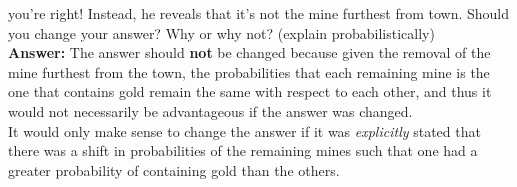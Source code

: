 \documentclass[12pt, letterpaper, twoside]{article}
\begin{document}
\begin{enumerate}
\begin{enumerate}
			you’re right! Instead, he reveals that it’s not the
			mine furthest from town. Should you change your answer?
			Why or why not? (explain probabilistically)\\
			\textbf{Answer:} The answer should \textbf{not} be changed because
			given the removal of the mine furthest from the town,
			the probabilities that each remaining mine is the one that
			contains gold remain the same with respect to each other,
			and thus it would not necessarily be advantageous if
			the answer was changed.\\
			It would only make sense to change
			the answer if it was \textit{explicitly} stated that there was a shift
			in probabilities of the remaining mines such that one had
			a greater probability of containing gold than the others.
		\end{enumerate}
	\end{enumerate}
\end{document}
